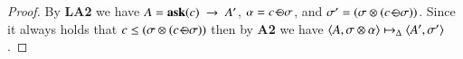 \documentclass[main.tex]{subfiles}
\begin{document}
\begin{proof}
	By \textbf{LA2} we have $A = {\bf ask}(c) \ \rightarrow \ A'$, $\alpha = c \, {\ominus\hspace{-7.8pt} \div} \, \sigma$, 
	and $\sigma' = (\sigma \otimes (c \, {\ominus\hspace{-7.8pt} \div} \, \sigma))$.
	Since it always holds that $c \leq (\sigma \otimes (c \, {\ominus\hspace{-7.8pt} \div} \, \sigma))$ then by \textbf{A2}
	we have $\langle A,\sigma \otimes \alpha \rangle \mapsto_\Delta \langle A',\sigma' \rangle$.
\end{proof}
\end{document}
